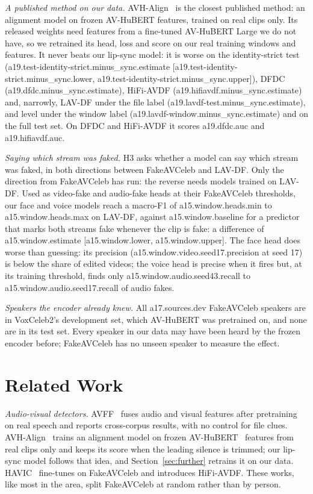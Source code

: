 \documentclass[conference]{IEEEtran}
\begin{document}
\textit{A published method on our data.} AVH-Align~\cite{smeu2025} is the
closest published method: an alignment model on frozen AV-HuBERT features,
trained on real clips only. Its released weights need features from a
fine-tuned AV-HuBERT Large we do not have, so we retrained its head, loss and
score on our real training windows and features. It never beats our lip-sync
model: it is worse on the identity-strict test
({{a19.test-identity-strict.minus_sync.estimate}}
[{{a19.test-identity-strict.minus_sync.lower}},
{{a19.test-identity-strict.minus_sync.upper}}]), DFDC
({{a19.dfdc.minus_sync.estimate}}), HiFi-AVDF
({{a19.hifiavdf.minus_sync.estimate}}) and, narrowly, LAV-DF under the file
label ({{a19.lavdf-test.minus_sync.estimate}}), and level under the window
label ({{a19.lavdf-window.minus_sync.estimate}}) and on the full test set. On
DFDC and HiFi-AVDF it scores {{a19.dfdc.auc}} and {{a19.hifiavdf.auc}}.

\textit{Saying which stream was faked.} H3 asks whether a model can say which
stream was faked, in both directions between FakeAVCeleb and LAV-DF. Only the
direction from FakeAVCeleb has run: the reverse needs models trained on LAV-DF.
Used as video-fake and audio-fake heads at their FakeAVCeleb thresholds, our
face and voice models reach a macro-F1 of {{a15.window.heads.min}} to
{{a15.window.heads.max}} on LAV-DF, against {{a15.window.baseline}} for a
predictor that marks both streams fake whenever the clip is fake: a difference
of {{a15.window.estimate}} [{{a15.window.lower}}, {{a15.window.upper}}]. The
face head does worse than guessing: its precision
({{a15.window.video.seed17.precision}} at seed 17) is below the share of
edited videos; the voice head is precise when it fires
but, at its training threshold, finds only {{a15.window.audio.seed43.recall}} to
{{a15.window.audio.seed17.recall}} of audio fakes.

\textit{Speakers the encoder already knew.} All {{a17.sources.dev}} FakeAVCeleb
speakers are in VoxCeleb2's development set, which AV-HuBERT was pretrained on,
and none are in its test set. Every speaker in our data may have been heard by
the frozen encoder before; FakeAVCeleb has no unseen speaker to measure the
effect.

\section{Related Work}
\label{sec:related}

\textit{Audio-visual detectors.} AVFF~\cite{avff} fuses audio and visual
features after pretraining on real speech and reports cross-corpus results,
with no control for file clues. AVH-Align~\cite{smeu2025} trains an alignment
model on frozen AV-HuBERT~\cite{avhubert} features from real clips only and
keeps its score when the leading silence is trimmed; our lip-sync model follows
that idea, and Section~\ref{sec:further} retrains it on our data.
HAVIC~\cite{havic} fine-tunes on FakeAVCeleb and introduces HiFi-AVDF. These
works, like most in the area, split FakeAVCeleb at random rather than by person.
\end{document}
